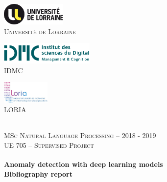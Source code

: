 \begin{titlepage}
\begin{center}


\begin{minipage}{0.3\textwidth}
	\begin{center}
		\includegraphics[height=3em]{./logos/ul_txt}~\\[1cm]
		
		\textsc{\LARGE Université de Lorraine}
	\end{center}
\end{minipage}
\begin{minipage}{0.3\textwidth}
\begin{center}
\includegraphics[height=3em]{./logos/idmc}~\\[1cm]

\textsc{\LARGE IDMC}
\end{center}
\end{minipage}
\begin{minipage}{0.3\textwidth}
\begin{center}
\includegraphics[height=3em]{./logos/loria}~\\[1cm]

\textsc{\LARGE LORIA}
\end{center}
\end{minipage}
\\[1.5cm]

\vfill
\textsc{\Large MSc Natural Language Processing -- 2018 - 2019 \\[.2cm]
UE 705 -- Supervised Project}\\[0.5cm]

\HRule \\[0.4cm]

{\huge \bfseries Anomaly detection with deep learning models\\
Bibliography report \\[0.4cm] }


\end{center}
\end{titlepage}
